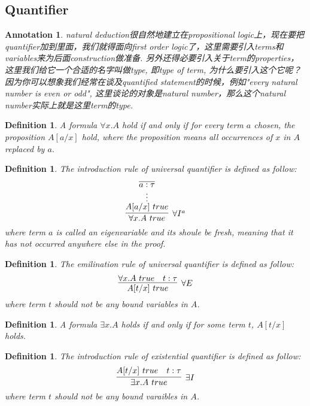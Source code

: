 \documentclass{article}
\theoremstyle{plain}
\newtheorem{definition}[theorem]{Definition}
\newtheorem{annotation}[theorem]{Annotation}
\theoremstyle{nonumberplain}
\begin{document}
\newpage
\subsection{Quantifier}

\begin{annotation}
\rm natural deduction很自然地建立在propositional logic上，现在要把quantifier加到里面，我们就得面向first order logic了，这里需要引入terms和variables来为后面construction做准备. 另外还得必要引入关于term的properties，这里我们给它一个合适的名字叫做type, 即type of term, 为什么要引入这个它呢？ 因为你可以想象我们经常在谈及quantified statement的时候，例如"every natural number is even or odd", 这里谈论的对象是natural number，那么这个natural number实际上就是这里term的type. 
\end{annotation}


\begin{definition}
\rm A formula $\forall x. A$ hold if and only if for every term $a$ chosen, the proposition $A[a/x]$ hold, where the proposition means all occurrences of $x$ in $A$ replaced by $a$. 
\end{definition}


\begin{definition}
\rm The introduction rule of universal quantifier is defined as follow:
$$
\infer[\forall I^a]{\forall x. A~true}{\deduce{A[a/x]~true}{\deduce{\vdots}{\infer{a:\tau}{}}}}
$$
where term $a$ is called an \emph{eigenvariable} and its shoule be fresh, meaning that it has not occurred anywhere else in the proof.
\end{definition}

\begin{definition}
\rm The emilination rule of universal quantifier is defined as follow:
$$
\infer[\forall E]{A[t/x]~true}{\forall x.A~true & t:\tau}
$$
where term $t$ should not be any bound variables in $A$.
\end{definition}

\begin{definition}
\rm A formula $\exists x.A$ holds if and only if for some term $t$, $A[t/x]$ holds.
\end{definition}

\begin{definition}
\rm The introduction rule of existential quantifier is defined as follow:
$$
\infer[\exists I]{\exists x. A~true}{A[t/x]~true & t:\tau}
$$
where term $t$ should not be any bound varaibles in $A$. 
\end{definition}
\end{document}

